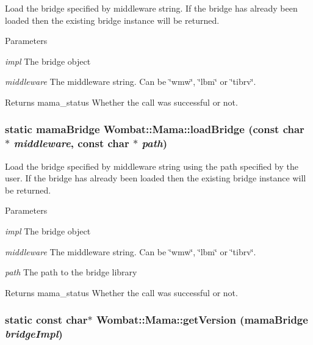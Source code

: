 Load the bridge specified by middleware string. If the bridge has already been loaded then the existing bridge instance will be returned. 
\begin{DoxyParams}{Parameters}
\item[{\em impl}]The bridge object \item[{\em middleware}]The middleware string. Can be \char`\"{}wmw\char`\"{}, \char`\"{}lbm\char`\"{} or \char`\"{}tibrv\char`\"{}. \end{DoxyParams}
\begin{DoxyReturn}{Returns}
mama\_\-status Whether the call was successful or not. 
\end{DoxyReturn}
\hypertarget{classWombat_1_1Mama_aa1a335543d17ecdfa3ef77a63920e6b8}{
\subsubsection[{loadBridge}]{\setlength{\rightskip}{0pt plus 5cm}static mamaBridge Wombat::Mama::loadBridge (const char $\ast$ {\em middleware}, \/  const char $\ast$ {\em path})}}
\label{classWombat_1_1Mama_aa1a335543d17ecdfa3ef77a63920e6b8}


Load the bridge specified by middleware string using the path specified by the user. If the bridge has already been loaded then the existing bridge instance will be returned. 
\begin{DoxyParams}{Parameters}
\item[{\em impl}]The bridge object \item[{\em middleware}]The middleware string. Can be \char`\"{}wmw\char`\"{}, \char`\"{}lbm\char`\"{} or \char`\"{}tibrv\char`\"{}. \item[{\em path}]The path to the bridge library \end{DoxyParams}
\begin{DoxyReturn}{Returns}
mama\_\-status Whether the call was successful or not. 
\end{DoxyReturn}
\hypertarget{classWombat_1_1Mama_a8f05e65f0ad4f8ea2ebe522539762f04}{
\subsubsection[{getVersion}]{\setlength{\rightskip}{0pt plus 5cm}static const char$\ast$ Wombat::Mama::getVersion (mamaBridge {\em bridgeImpl})}}
\label{classWombat_1_1Mama_a8f05e65f0ad4f8ea2ebe522539762f04}


